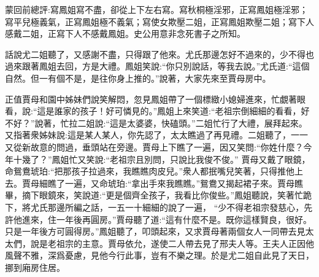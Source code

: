 

\begin{parag}
    \begin{note}蒙回前總評:寫鳳姐寫不盡，卻從上下左右寫。寫秋桐極淫邪，正寫鳳姐極淫邪；寫平兒極義氣，正寫鳳姐極不義氣；寫使女欺壓二姐，正寫鳳姐欺壓二姐；寫下人感戴二姐，正寫下人不感戴鳳姐。史公用意非念死書子之所知。\end{note}
\end{parag}


\begin{parag}
    話說尤二姐聽了，又感謝不盡，只得跟了他來。尤氏那邊怎好不過來的，少不得也過來跟著鳳姐去回，方是大禮。鳳姐笑說:“你只別說話，等我去說。”尤氏道:“這個自然。但一有個不是，是往你身上推的。”說著，大家先來至賈母房中。
\end{parag}


\begin{parag}
    正值賈母和園中姊妹們說笑解悶，忽見鳳姐帶了一個標緻小媳婦進來，忙覷著眼看，說:“這是誰家的孩子！好可憐見的。”鳳姐上來笑道:“老祖宗倒細細的看看，好不好？”說著，忙拉二姐說:“這是太婆婆，快磕頭。”二姐忙行了大禮，展拜起來。又指著衆姊妹說:這是某人某人，你先認了，太太瞧過了再見禮。二姐聽了，一一又從新故意的問過，垂頭站在旁邊。賈母上下瞧了一遍，因又笑問:“你姓什麼？今年十幾了？”鳳姐忙又笑說:“老祖宗且別問，只說比我俊不俊。” 賈母又戴了眼鏡，命鴛鴦琥珀:“把那孩子拉過來，我瞧瞧肉皮兒。”衆人都抿嘴兒笑著，只得推他上去。賈母細瞧了一遍，又命琥珀:“拿出手來我瞧瞧。”鴛鴦又揭起裙子來。賈母瞧畢，摘下眼鏡來，笑說道:“更是個齊全孩子，我看比你俊些。”鳳姐聽說，笑著忙跪下，將尤氏那邊所編之話，一五一十細細的說了一遍， “少不得老祖宗發慈心，先許他進來，住一年後再圓房。”賈母聽了道:“這有什麼不是。既你這樣賢良，很好。只是一年後方可圓得房。”鳳姐聽了，叩頭起來，又求賈母著兩個女人一同帶去見太太們，說是老祖宗的主意。賈母依允，遂使二人帶去見了邢夫人等。王夫人正因他風聲不雅，深爲憂慮，見他今行此事，豈有不樂之理。於是尤二姐自此見了天日，挪到廂房住居。
\end{parag}


